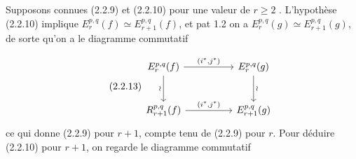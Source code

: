 
Supposons connues (2.2.9) et (2.2.10) pour une valeur de $r \geq 2$ . L'hypothèse (2.2.10) implique $E_r^{p,q}(f) \simeq E_{r+1}^{p,q}(f)$, et pat 1.2 on a $E_r^{p,q}(g) \simeq E_{r+1}^{p,q}(g)$, de sorte qu'on a le diagramme commutatif

\begin{equation}\tag{2.2.13}
\begin{tikzcd}[column sep=huge, row sep=large]
E_r^{p,q}(f) \arrow[r, "{(i^*,j^*)}"] \arrow[d, "\wr"'] & E_r^{p,q}(g) \arrow[d, "\wr"] \\
R_{r+1}^{p,q}(f) \arrow[r, "{(i^*,j^*)}"] & E_{r+1}^{p,q}(g)
\end{tikzcd}
\end{equation}
ce qui donne (2.2.9) pour $r+1$, compte tenu de (2.2.9) pour $r$. Pour déduire (2.2.10) pour $r+1$, on regarde le diagramme commutatif

